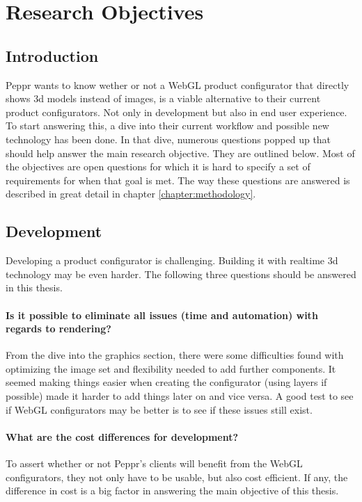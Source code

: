 \chapter{Research Objectives}
\label{sec:researchObj}
\section{Introduction}
Peppr wants to know wether or not a WebGL product configurator that directly shows 3d models instead of images, is a viable alternative to their current product configurators. Not only in development but also in end user experience. To start answering this, a dive into their current workflow and possible new technology has been done. In that dive, numerous questions popped up that should help answer the main research objective. They are outlined below. Most of the objectives are open questions for which it is hard to specify a set of requirements for when that goal is met. The way these questions are answered is described in great detail in chapter \ref{chapter:methodology}.
\section{Development}
Developing a product configurator is challenging. Building it with realtime 3d technology may be even harder. The following three questions should be answered in this thesis.
\subsubsection {Is it possible to eliminate all issues (time and automation) with regards to rendering?}
From the dive into the graphics section, there were some difficulties found with optimizing the image set and flexibility needed to add further components. It seemed making things easier when creating the configurator (using layers if possible) made it harder to add things later on and vice versa. A good test to see if WebGL configurators may be better is to see if these issues still exist.

\subsubsection{What are the cost differences for development?}
To assert whether or not Peppr's clients will benefit from the WebGL configurators, they not only have to be usable, but also cost efficient. If any, the difference in cost is a big factor in answering the main objective of this thesis.

